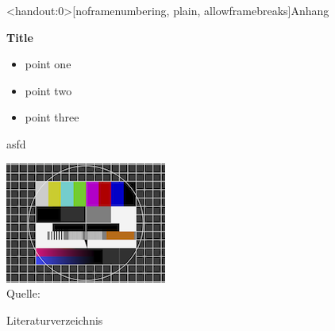 \documentclass[aspectratio=169]{beamer} %
\newcommand{\figcite}[1]{\\[-3mm]{\tiny Quelle: \cite{#1}}}
\begin{document}
  \begin{frame}<handout:0>[noframenumbering, plain, allowframebreaks]{Anhang}
      \begin{minipage}{0.4\textwidth}
        \textbf{Title}
        \begin{itemize}
          \item point one
          \item point two
          \item point three
        \end{itemize}
      \end{minipage}
      \hfill
      \begin{minipage}{0.58\textwidth}
        asfd
      \end{minipage}
      
    \pagebreak
      \includegraphics[height=0.9\textheight, width=\linewidth, keepaspectratio]{Images/test_pattern.png}%
      \figcite{C.Amsler.2017}
    
    \end{frame}


    
  \begin{frame}{Literaturverzeichnis}
   \printbibliography%
    \end{frame}
\end{document}
